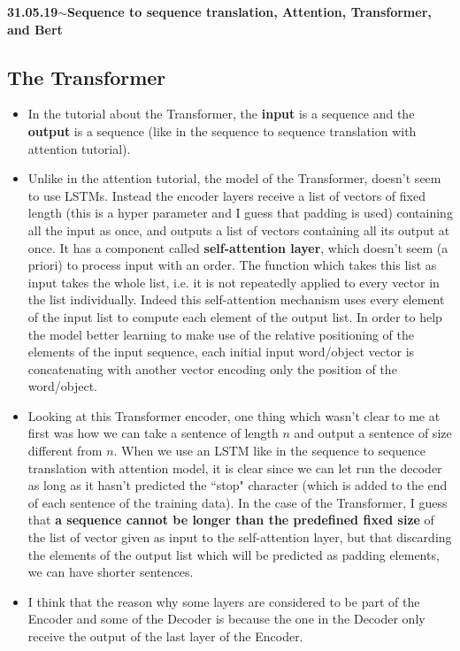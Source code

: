 \documentclass[11pt,a4paper]{article}
\newenvironment{loggentry}[2]%
{\noindent\textbf{#1}\hspace{1cm}$\mathbf{\sim}$\text{ }\textbf{#2}\\}{\vspace{0.5cm}}
\begin{document}
\begin{loggentry}{31.05.19}{Sequence to sequence translation, Attention, Transformer, and Bert}
\subsection{The Transformer}

\begin{itemize}
\item In the tutorial about the Transformer, the \textbf{input} is a sequence and the \textbf{output} is a sequence (like in the sequence to sequence translation with attention tutorial).
\item Unlike in the attention tutorial, the model of the Transformer, doesn't seem to use LSTMs. Instead the encoder layers receive a list of vectors of fixed length (this is a hyper parameter and I guess that padding is used) containing all the input as once, and outputs a list of vectors containing all its output at once. It has a component called \textbf{self-attention layer}, which doesn't seem (a priori) to process input with an order. The function which takes this list as input takes the whole list, i.e. it is not repeatedly applied to every vector in the list individually. Indeed this self-attention mechanism uses every element of the input list to compute each element of the output list. In order to help the model better learning to make use of the relative positioning of the elements of the input sequence, each initial input word/object vector is concatenating with another vector encoding only the position of the word/object.
\item Looking at this Transformer encoder, one thing which wasn't clear to me at first was how we can take a sentence of length $n$ and output a sentence of size different from $n$. When we use an LSTM like in the sequence to sequence translation with attention model, it is clear since we can let run the decoder as long as it hasn't predicted the ``stop" character (which is added to the end of each sentence of the training data). In the case of the Transformer, I guess that \textbf{a sequence cannot be longer than the predefined fixed size} of the list of vector given as input to the self-attention layer, but that discarding the elements of the output list which will be predicted as padding elements, we can have shorter sentences.
\item I think that the reason why some layers are considered to be part of the Encoder and some of the Decoder is because the one in the Decoder only receive the output of the last layer of the Encoder.

\end{itemize}
\end{loggentry}
\end{document}

